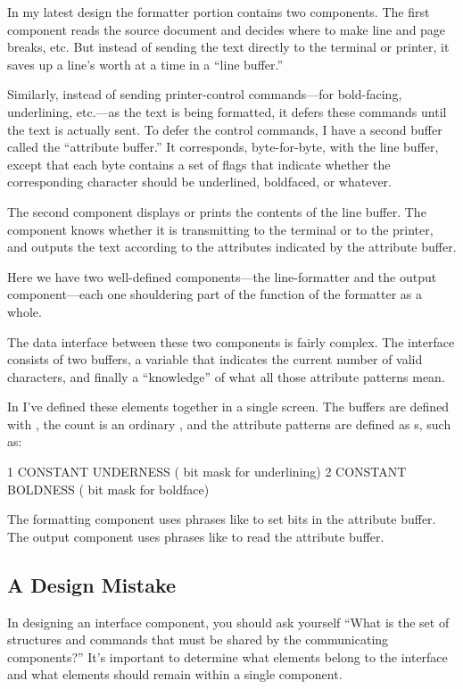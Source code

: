 In my latest design the formatter portion contains two components.
The first component reads the source document and decides where to
make line and page breaks, etc. But instead of sending the text directly to
the terminal or printer, it saves up a line's worth at a time in a ``line
buffer.''

Similarly, instead of sending printer-control commands---for
bold-facing, underlining, etc.---as the text is being formatted, it
defers these commands until the text is actually sent. To defer the
control commands, I have a second buffer called the ``attribute
buffer.'' It corresponds, byte-for-byte, with the line buffer, except
that each byte contains a set of flags that indicate whether the
corresponding character should be underlined, boldfaced, or whatever.

The second component displays or prints the contents of the line
buffer. The component knows whether it is transmitting to the terminal
or to the printer, and outputs the text according to the attributes
indicated by the attribute buffer.

Here we have two well-defined components---the line-formatter and
the output component---each one shouldering part of the function of the
formatter as a whole.

The data interface between these two components is fairly complex.
The interface consists of two buffers, a variable that indicates the
current number of valid characters, and finally a ``knowledge'' of what
all those attribute patterns mean.

In \Forth{} I've defined these elements together in a single screen.  The
buffers are defined with , the count is an ordinary
, and the attribute patterns are defined as
s, such as:
\begin{Code}
1 CONSTANT UNDERNESS ( bit mask for underlining)
2 CONSTANT BOLDNESS ( bit mask for boldface)
\end{Code}
The formatting component uses phrases like 
to set bits in the attribute buffer. The output component uses phrases
like  to read the attribute buffer.

\subsection{A Design Mistake}

In designing an interface component, you should ask yourself ``What is
the set of structures and commands that must be shared by the
communicating components?'' It's important to determine what elements
belong to the interface and what elements should remain within a
single component.

